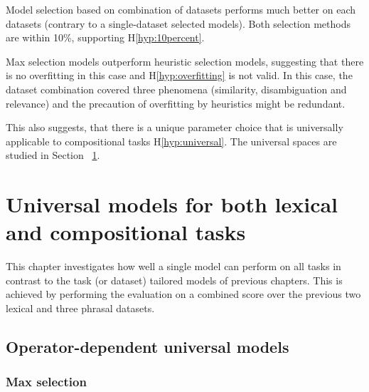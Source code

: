 Model selection based on combination of datasets performs much better on each datasets (contrary to a single-dataset selected models). Both selection methods are within 10\%, supporting H\ref{hyp:10percent}.

Max selection models outperform heuristic selection models, suggesting that there is no overfitting in this case and H\ref{hyp:overfitting} is not valid. In this case, the dataset combination covered three phenomena (similarity, disambiguation and relevance) and the precaution of overfitting by heuristics might be redundant.

This also suggests, that there is a unique parameter choice that is universally applicable to compositional tasks H\ref{hyp:universal}. The universal spaces are studied in Section~
\ref{sec:universal-param-selection}.

\chapter[Universal models]{Universal models for both lexical and compositional tasks}
\label{sec:universal-param-selection}

This chapter investigates how well a single model can perform on all tasks in contrast to the task (or dataset) tailored models of previous chapters. This is achieved by performing the evaluation on a combined score over the previous two lexical and three phrasal datasets.

\section{Operator-dependent universal models}
\label{sec:model-selection}

\subsection{Max selection}
\label{sec:max-selection-universal}

